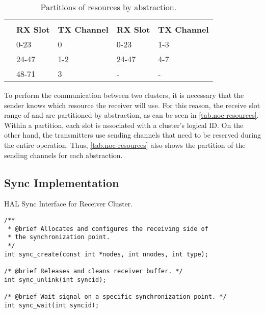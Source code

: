 			\begin{table}[t]
				\centering%
				\caption{Partitions of \noc resources by abstraction.}%
				\label{tab.noc-resources}%

				\begin{tabular}{l|l|l|l|l|}
					\cline{2-5}
															& \multicolumn{2}{c|}{\textbf{\cnoc}}    & \multicolumn{2}{c|}{\textbf{\dnoc}}    \\ \cline{2-5}
															& \textbf{RX Slot} & \textbf{TX Channel} & \textbf{RX Slot} & \textbf{TX Channel} \\ \hline
					\multicolumn{1}{|l|}{\textbf{\mailbox}} & 0-23             & 0                   & 0-23             & 1-3                 \\ \hline
					\multicolumn{1}{|l|}{\textbf{\portal}}  & 24-47            & 1-2                 & 24-47            & 4-7                 \\ \hline
					\multicolumn{1}{|l|}{\textbf{\sync}}    & 48-71            & 3                   & -                & -                   \\ \hline
				\end{tabular}

			\end{table}

			To perform the communication between two clusters, it is necessary that the
			sender knows which resource the receiver will use.
			For this reason, the receive slot range of \cnoc and \dnoc are partitioned
			by abstraction, as can be seen in \autoref{tab.noc-resources}.
			Within a partition, each slot is associated with a cluster's logical ID.
			On the other hand, the transmitters use sending channels that need to
			be reserved during the entire operation.
			Thus, \autoref{tab.noc-resources} also shows the partition of the
			sending channels for each abstraction.

		\subsection*{Sync Implementation}

\begin{listing}[t]
\caption{HAL Sync Interface for Receiver Cluster.}
\label{code:sync-receiver}
\begin{verbatim}
/**
 * @brief Allocates and configures the receiving side of
 * the synchronization point.
 */
int sync_create(const int *nodes, int nnodes, int type);

/* @brief Releases and cleans receiver buffer. */
int sync_unlink(int syncid);

/* @brief Wait signal on a specific synchronization point. */
int sync_wait(int syncid);
\end{verbatim}
\end{listing}

